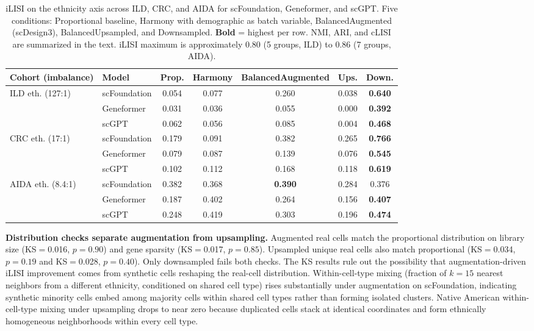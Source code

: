 \documentclass[sigconf]{acmart}
\begin{document}
\begin{table}[!t]
\caption{iLISI on the ethnicity axis across ILD, CRC, and AIDA for scFoundation, Geneformer, and scGPT. Five conditions: Proportional baseline, Harmony with demographic as batch variable, BalancedAugmented (scDesign3), BalancedUpsampled, and Downsampled. \textbf{Bold} = highest per row. NMI, ARI, and cLISI are summarized in the text. iLISI maximum is approximately 0.80 (5 groups, ILD) to 0.86 (7 groups, AIDA).}
\label{tab:integration}
\centering
\small
\begin{tabular}{ll ccccc}
\toprule
\textbf{Cohort (imbalance)} & \textbf{Model} & Prop. & Harmony & BalancedAugmented & Ups. & Down. \\
\midrule
\multirow{3}{*}{ILD eth. (127:1)}
 & scFoundation & 0.054 & 0.077 & 0.260 & 0.038 & \textbf{0.640} \\
 & Geneformer   & 0.031 & 0.036 & 0.055 & 0.000 & \textbf{0.392} \\
 & scGPT        & 0.062 & 0.056 & 0.085 & 0.004 & \textbf{0.468} \\
\midrule
\multirow{3}{*}{CRC eth. (17:1)}
 & scFoundation & 0.179 & 0.091 & 0.382 & 0.265 & \textbf{0.766} \\
 & Geneformer   & 0.079 & 0.087 & 0.139 & 0.076 & \textbf{0.545} \\
 & scGPT        & 0.102 & 0.112 & 0.168 & 0.118 & \textbf{0.619} \\
\midrule
\multirow{3}{*}{AIDA eth. (8.4:1)}
 & scFoundation & 0.382 & 0.368 & \textbf{0.390} & 0.284 & 0.376 \\
 & Geneformer   & 0.187 & 0.402 & 0.264 & 0.156 & \textbf{0.407} \\
 & scGPT        & 0.248 & 0.419 & 0.303 & 0.196 & \textbf{0.474} \\
\bottomrule
\end{tabular}
\end{table}

\textbf{Distribution checks separate augmentation from upsampling.} Augmented real cells match the proportional distribution on library size (KS$=$0.016, $p{=}0.90$) and gene sparsity (KS$=$0.017, $p{=}0.85$). Upsampled unique real cells also match proportional (KS$=$0.034, $p{=}0.19$ and KS$=$0.028, $p{=}0.40$). Only downsampled fails both checks. The KS results rule out the possibility that augmentation-driven iLISI improvement comes from synthetic cells reshaping the real-cell distribution. Within-cell-type mixing (fraction of $k=15$ nearest neighbors from a different ethnicity, conditioned on shared cell type) rises substantially under augmentation on scFoundation, indicating synthetic minority cells embed among majority cells within shared cell types rather than forming isolated clusters. Native American within-cell-type mixing under upsampling drops to near zero because duplicated cells stack at identical coordinates and form ethnically homogeneous neighborhoods within every cell type.
\end{document}
